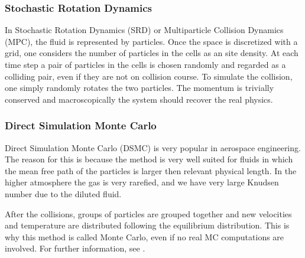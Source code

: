 \subsubsection*{Stochastic Rotation Dynamics}

In Stochastic Rotation Dynamics (SRD) or Multiparticle Collision Dynamics (MPC), the fluid is represented by particles. Once the space is discretized with a grid, one considers the number of particles in the cells as an site density.  At each time step a pair of particles in the cells is chosen randomly and regarded as a colliding pair, even if they are not on collision course. To simulate the collision, one simply randomly rotates the two particles. The momentum is trivially conserved and macroscopically the system should recover the real physics.



\subsubsection*{Direct Simulation Monte Carlo}

Direct Simulation Monte Carlo (DSMC) \citep{dsmc1,dsmc2} is very popular in aerospace engineering. The reason for this is because the method is very well suited for fluids in which the mean free path of the particles is larger then relevant physical length. In the higher atmosphere the gas is very rarefied, and we have very large Knudsen number due to the diluted fluid.


After the collisions, groups of particles are grouped together and new velocities and temperature are distributed following the equilibrium distribution. This is why this method is called Monte Carlo, even if no real MC computations are involved. For further information, see \citet{dsmc3,dsmc4}.


\newpage

